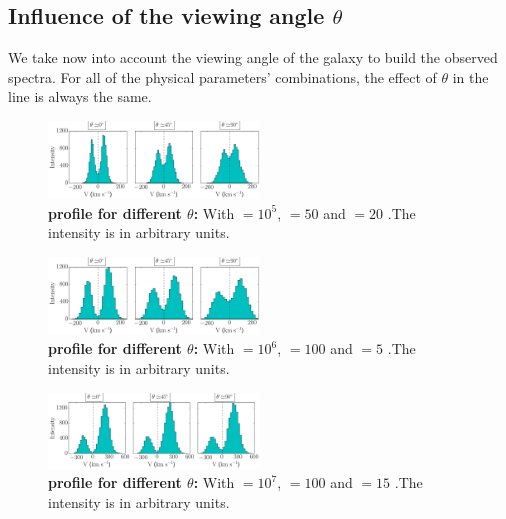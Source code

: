 \documentclass[twocolappendix]{latex/emulateapj}
\begin{document}
\subsection{Influence of the viewing angle $\theta$}
We take now into account the viewing angle of the galaxy to build the observed spectra. For all of the physical parameters' combinations, the effect of $\theta$ in the \lya line is always the same.\\

\begin{figure}[h!]
	\begin{center}
		\includegraphics[width=0.5\textwidth]{./figures/influence_viewing_angle_5}
	\end{center}
	\caption{\textbf{\lya profile for different $\theta$:} With \tauh$=10^5$, \vrot$=50$ \kms and \vout$=20$ \kms.The intensity is in arbitrary units.
		\label{fig:influence_viewing_angle_5}}
\end{figure}

\begin{figure}[h!]
	\begin{center}
		\includegraphics[width=0.5\textwidth]{./figures/influence_viewing_angle_6}
	\end{center}
	\caption{\textbf{\lya profile for different $\theta$:} With \tauh$=10^6$, \vrot$=100$ \kms and \vout$=5$ \kms.The intensity is in arbitrary units.
		\label{fig:influence_viewing_angle_6}}
\end{figure}

\begin{figure}[h!]
	\begin{center}
		\includegraphics[width=0.5\textwidth]{./figures/influence_viewing_angle_7}
	\end{center}
	\caption{\textbf{\lya profile for different $\theta$:} With \tauh$=10^7$, \vrot$=100$ \kms and \vout$=15$ \kms.The intensity is in arbitrary units.
		\label{fig:influence_viewing_angle_7}}
\end{figure}
\end{document}
